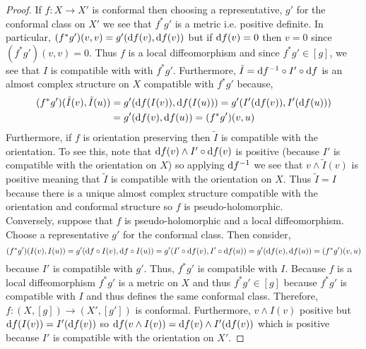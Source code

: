 \documentclass[12pt]{article}
\begin{document}
\begin{proof}
If $f : X \to X'$ is conformal then choosing a representative, $g'$ for the conformal class on $X'$ we see that $f^* g'$ is a metric i.e. positive definite. In particular, $(f^* g')(v, v) = g'(\mathrm{d}{f}(v), \mathrm{d}{f}(v))$ but if $\mathrm{d}{f}(v) = 0$ then $v = 0$ since $(f^* g')(v, v) = 0$. Thus $f$ is a local diffeomorphism and since $f^* g' \in [g]$, we see that $I$ is compatible with with $f^* g'$. Furthermore, $\tilde{I} = \mathrm{d}{f}^{-1} \circ I' \circ \mathrm{d}{f}$ is an almost complex structure on $X$ compatible with $f^* g'$ because,
\begin{align*}
(f^* g')(\tilde{I}(v), \tilde{I}(u)) & = g'(\mathrm{d}{f}(I(v)), \mathrm{d}{f}(I(u))) = g'(I'(\mathrm{d}{f}(v)), I'(\mathrm{d}{f}(u))) 
\\
& = g'(\mathrm{d}{f}(v), \mathrm{d}{f}(u)) = (f^* g')(v, u)
\end{align*}
Furthermore, if $f$ is orientation preserving then $\tilde{I}$ is compatible with the orientation. To see this, note that $\mathrm{d}{f}(v) \wedge I' \circ \mathrm{d}{f}(v)$ is positive (because $I'$ is compatible with the orientation on $X$) so applying $\mathrm{d}{f}^{-1}$ we see that $v \wedge \tilde{I}(v)$ is positive meaning that $\tilde{I}$ is compatible with the orientation on $X$. Thus $\tilde{I} = I$ because there is a unique almost complex structure compatible with the orientation and conformal structure so $f$ is pseudo-holomorphic.
\bigskip\\
Conversely, suppose that $f$ is pseudo-holomorphic and a local diffeomorphism. Choose a representative $g'$ for the conformal class. Then consider,
\[ (f^* g')(I(v), I(u)) = g'(\mathrm{d}{f} \circ I(v), \mathrm{d}{f} \circ I(u)) = g'(I' \circ \mathrm{d}{f}(v), I' \circ \mathrm{d}{f}(u)) = g'(\mathrm{d}{f}(v), \mathrm{d}{f}(u)) = (f^* g')(v, u) \]
because $I'$ is compatible with $g'$. Thus, $f^* g'$ is compatible with $I$. Because $f$ is a local diffeomorphism $f^* g'$ is a metric on $X$ and thus $f^* g' \in [g]$ because $f^* g'$ is compatible with $I$ and thus defines the same conformal class. Therefore, $f : (X, [g]) \to (X', [g'])$ is conformal. Furthermore, $v \wedge I(v)$ positive but $\mathrm{d}{f}(I(v)) = I'(\mathrm{d}{f}(v))$ so $\mathrm{d}{f}(v \wedge I(v)) = \mathrm{d}{f}(v) \wedge I'(\mathrm{d}{f}(v))$ which is positive because $I'$ is compatible with the orientation on $X'$.  
\end{proof}
\end{document}
